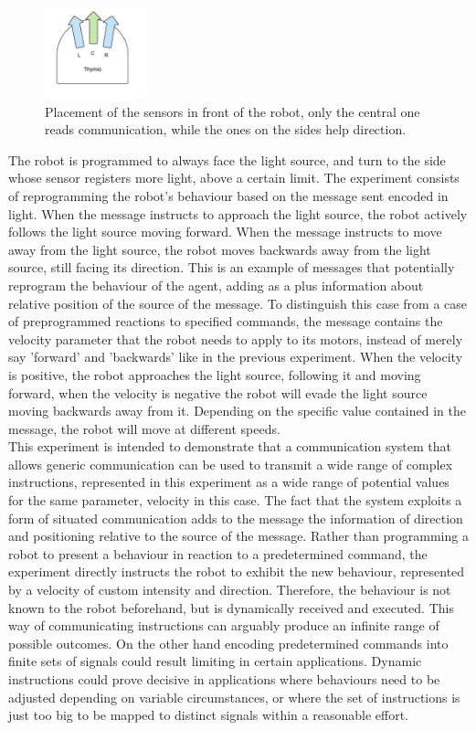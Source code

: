 \begin{figure}[hbt]
\centering
  \includegraphics[height=100px]{img/thymioangles}
  \caption{Placement of the sensors in front of the robot, only the central one reads communication, while the ones on the sides help direction.}
  \label{fig:thymioangles}
\end{figure}
%
The robot is programmed to always face the light source, and turn to the side whose sensor registers more light, above a certain limit.
The experiment consists of reprogramming the robot's behaviour based on the message sent encoded in light.
When the message instructs to approach the light source, the robot actively follows the light source moving forward.
When the message instructs to move away from the light source, the robot moves backwards away from the light source, still facing its direction.
This is an example of messages that potentially reprogram the behaviour of the agent, adding as a plus information about relative position of the source of the message.
To distinguish this case from a case of preprogrammed reactions to specified commands, the message contains the velocity parameter that the robot needs to apply to its motors, instead of merely say 'forward' and 'backwards' like in the previous experiment.
When the velocity is positive, the robot approaches the light source, following it and moving forward, when the velocity is negative the robot will evade the light source moving backwards away from it.
Depending on the specific value contained in the message, the robot will move at different speeds.\\

This experiment is intended to demonstrate that a communication system that allows generic communication can be used to transmit a wide range of complex instructions, represented in this experiment as a wide range of potential values for the same parameter, velocity in this case.
The fact that the system exploits a form of situated communication adds to the message the information of direction and positioning relative to the source of the message.
Rather than programming a robot to present a behaviour in reaction to a predetermined command, the experiment directly instructs the robot to exhibit the new behaviour, represented by a velocity of custom intensity and direction.
Therefore, the behaviour is not known to the robot beforehand, but is dynamically received and executed.
This way of communicating instructions can arguably produce an infinite range of possible outcomes.
On the other hand encoding predetermined commands into finite sets of signals could result limiting in certain applications.
Dynamic instructions could prove decisive in applications where behaviours need to be adjusted depending on variable circumstances, or where the set of instructions is just too big to be mapped to distinct signals within a reasonable effort.

